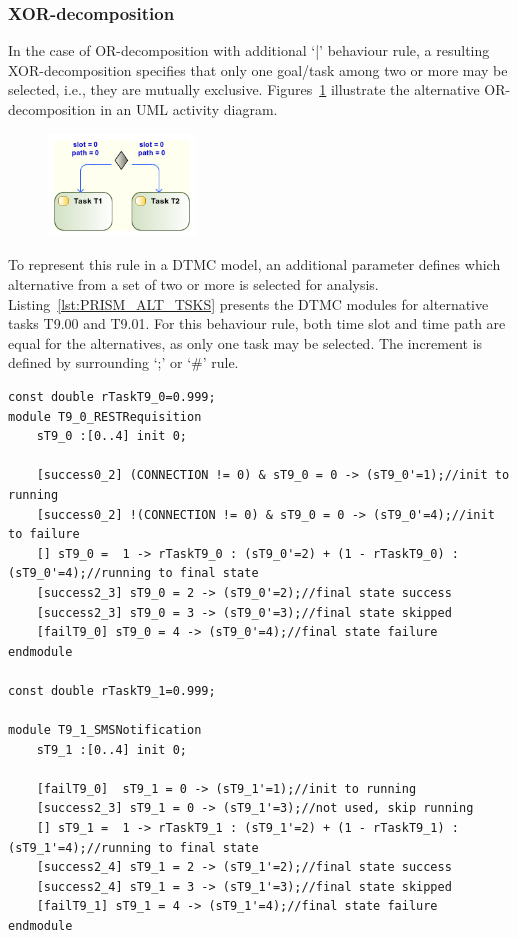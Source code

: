 
\subsubsection{XOR-decomposition}

In the case of OR-decomposition with additional `|' behaviour rule, a resulting XOR-decomposition specifies that only one goal/task among two or more may be selected, i.e., they are mutually exclusive. Figures~\ref{fig:UML_ALT_TSKS} illustrate the alternative OR-decomposition in an UML activity diagram.

\begin{figure}[ht!]
\centering
\includegraphics[width=0.35\textwidth]{imgs/UML_ALT_TSKS.png}
\caption{}
\label{fig:UML_ALT_TSKS}
\end{figure}

To represent this rule in a DTMC model, an additional parameter  defines which alternative from a set of two or more is selected for analysis. Listing~\ref{lst:PRISM_ALT_TSKS} presents the DTMC modules for alternative tasks T9.00 and T9.01. For this behaviour rule, both time slot and time path are equal for the alternatives, as only one task may be selected. The increment is defined by surrounding `;' or `\#' rule. 
\medskip

\begin{lstlisting}[language=Prism, caption={Alternative tasks T9.00 and T9.01 as DTMC modules with additional integer parameter used for selection.},label={lst:PRISM_ALT_TSKS}] 
const double rTaskT9_0=0.999;
module T9_0_RESTRequisition
	sT9_0 :[0..4] init 0;
	
	[success0_2] (CONNECTION != 0) & sT9_0 = 0 -> (sT9_0'=1);//init to running
	[success0_2] !(CONNECTION != 0) & sT9_0 = 0 -> (sT9_0'=4);//init to failure
	[] sT9_0 =  1 -> rTaskT9_0 : (sT9_0'=2) + (1 - rTaskT9_0) : (sT9_0'=4);//running to final state
	[success2_3] sT9_0 = 2 -> (sT9_0'=2);//final state success
	[success2_3] sT9_0 = 3 -> (sT9_0'=3);//final state skipped
	[failT9_0] sT9_0 = 4 -> (sT9_0'=4);//final state failure
endmodule

const double rTaskT9_1=0.999;

module T9_1_SMSNotification
	sT9_1 :[0..4] init 0;
	
	[failT9_0]  sT9_1 = 0 -> (sT9_1'=1);//init to running
	[success2_3] sT9_1 = 0 -> (sT9_1'=3);//not used, skip running
	[] sT9_1 =  1 -> rTaskT9_1 : (sT9_1'=2) + (1 - rTaskT9_1) : (sT9_1'=4);//running to final state
	[success2_4] sT9_1 = 2 -> (sT9_1'=2);//final state success
	[success2_4] sT9_1 = 3 -> (sT9_1'=3);//final state skipped
	[failT9_1] sT9_1 = 4 -> (sT9_1'=4);//final state failure
endmodule
\end{lstlisting}

